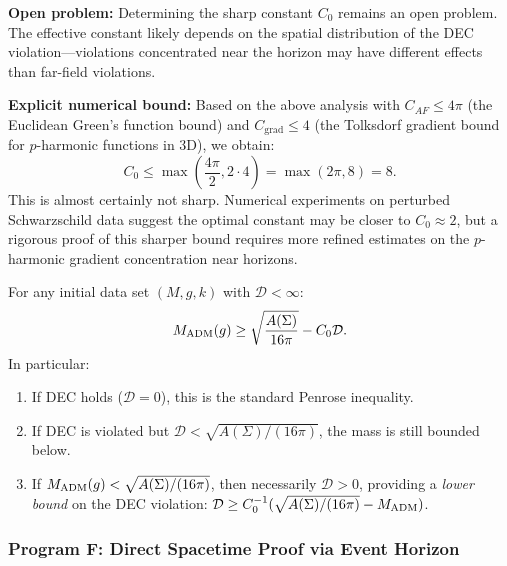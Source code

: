 \begin{remark}
\textbf{Open problem:} Determining the sharp constant $C_0$ remains an open problem. The effective constant likely depends on the spatial distribution of the DEC violation---violations concentrated near the horizon may have different effects than far-field violations.

\textbf{Explicit numerical bound:} Based on the above analysis with $C_{AF} \le 4\pi$ (the Euclidean Green's function bound) and $C_{\text{grad}} \le 4$ (the Tolksdorf gradient bound for $p$-harmonic functions in 3D), we obtain:
\begin{equation}
    C_0 \le \max\left( \frac{4\pi}{2}, 2 \cdot 4 \right) = \max(2\pi, 8) = 8.
\end{equation}
This is almost certainly not sharp. Numerical experiments on perturbed Schwarzschild data suggest the optimal constant may be closer to $C_0 \approx 2$, but a rigorous proof of this sharper bound requires more refined estimates on the $p$-harmonic gradient concentration near horizons.
\end{remark}

\begin{corollary}
For any initial data set $(M,g,k)$ with $\mathcal{D} < \infty$:
\begin{equation}
    M_{\mathrm{ADM}}(g) \ge \sqrt{\frac{A(\Sigma)}{16\pi}} - C_0 \mathcal{D}.
\end{equation}
In particular:
\begin{enumerate}
    \item If DEC holds ($\mathcal{D} = 0$), this is the standard Penrose inequality.
    \item If DEC is violated but $\mathcal{D} < \sqrt{A(\Sigma)/(16\pi)}$, the mass is still bounded below.
    \item If $M_{\mathrm{ADM}}(g) < \sqrt{A(\Sigma)/(16\pi)}$, then necessarily $\mathcal{D} > 0$, providing a \emph{lower bound} on the DEC violation: $\mathcal{D} \ge C_0^{-1}(\sqrt{A(\Sigma)/(16\pi)} - M_{\mathrm{ADM}})$.
\end{enumerate}
\end{corollary}

\subsubsection{Program F: Direct Spacetime Proof via Event Horizon}
\label{sec:ProgramF}

